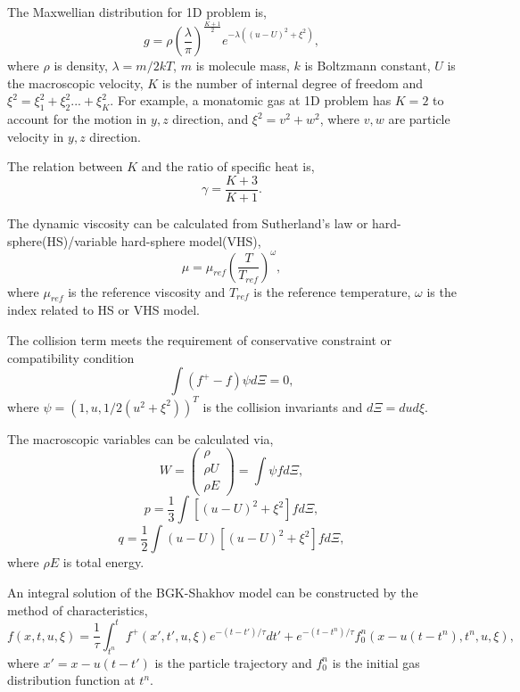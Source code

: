 \documentclass[a4paper]{book}
\begin{document}
The Maxwellian distribution for 1D problem is,
\begin{equation}
    \label{eq:maxwell_1D}
    g = \rho\left(\frac{\lambda}{\pi}\right)^{\frac{K+1}{2}}e^{-\lambda((u-U)^2+\xi^2)},
\end{equation}
where $\rho$ is density, $\lambda=m/2kT$, $m$ is molecule mass, $k$ is Boltzmann constant, $U$ is the macroscopic velocity, $K$ is the number of internal degree of freedom and $\xi^2=\xi_1^2+\xi_2^2...+\xi_K^2$. For example, a monatomic gas at 1D problem has $K=2$ to account for the motion in $y,z$ direction, and $\xi^2=v^2+w^2$, where $v,w$ are particle velocity in $y,z$ direction. 

The relation between $K$ and the ratio of specific heat is,
\begin{equation} 
    \gamma = \frac{K+3}{K+1}.
\end{equation}

The dynamic viscosity can be calculated from Sutherland's law or hard-sphere(HS)/variable hard-sphere model(VHS),
\begin{equation} 
    \label{eq:viscosity}
    \mu = \mu_{ref}\left(\frac{T}{T_{ref}}\right)^\omega,
\end{equation} 
where $\mu_{ref}$ is the reference viscosity and $T_{ref}$ is the reference temperature, $\omega$ is the index related to HS or VHS model.

The collision term meets the requirement of conservative constraint or compatibility condition
\begin{equation} 
    \int (f^+-f)\psi d\Xi=0,
\end{equation} 
where $\psi=(1,u,1/2(u^2+\xi^2))^T$ is the collision invariants and $d\Xi=dud\xi$.

The macroscopic variables can be calculated via,
\begin{equation}
W=\begin{pmatrix} \rho\\ \rho U\\ \rho E \end{pmatrix} = \int \psi fd\Xi,
\end{equation}
\begin{equation}
    p=\frac{1}{3}\int [(u-U)^2+\xi^2]fd\Xi,
\end{equation}
\begin{equation}
    q=\frac{1}{2}\int (u-U)[(u-U)^2+\xi^2]fd\Xi,
\end{equation}
where $\rho E$ is total energy.

An integral solution of the BGK-Shakhov model can be constructed by the method of characteristics\cite{Prendergast1993},
\begin{equation}
    \label{eq:csolution}
    f(x,t,u,\xi)=\frac{1}{\tau}\int_{t^n}^t f^+(x',t',u,\xi)e^{-(t-t')/\tau}dt'+e^{-(t-t^n)/\tau}f_0^n(x-u(t-t^n),t^n,u,\xi),
\end{equation}
where $x'=x-u(t-t')$ is the particle trajectory and $f_0^n$ is the initial gas distribution function at $t^n$.
\end{document}
